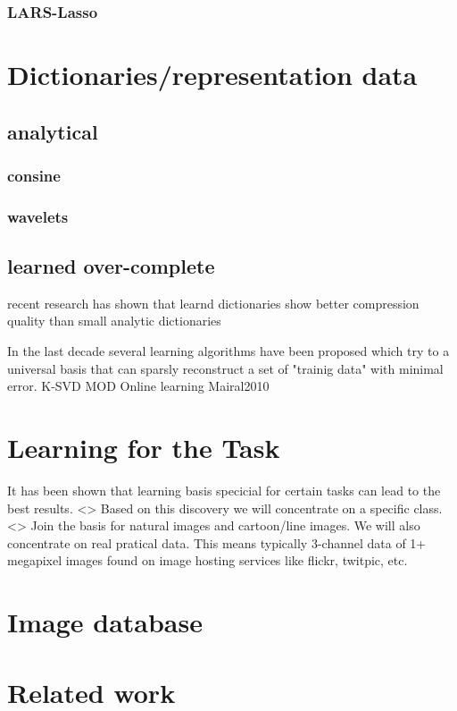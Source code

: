 \subsubsection{LARS-Lasso}


\section{Dictionaries/representation data}
\subsection{analytical}
\subsubsection{consine}
\subsubsection{wavelets}
\subsection{learned over-complete}
recent research has shown that learnd dictionaries show better compression quality than small analytic dictionaries \cite{Aharon2006KSVD} \cite{Chen1998Atomic} 


In the last decade several learning algorithms have been proposed which try to a universal basis that 
can sparsly reconstruct a set of "trainig data" with minimal error. 
K-SVD
MOD
Online learning
Mairal2010

\section{Learning for the Task}
It has been shown that learning basis specicial for certain tasks can lead to the best results\cite{}.  <>
Based on this discovery we will concentrate on a specific class. <> Join the basis for natural images and cartoon/line images.
We will also concentrate on real pratical data. This means typically 3-channel data of 1+ megapixel images found on image hosting services like flickr, twitpic, etc.

\section{Image database}

\section{Related work}

